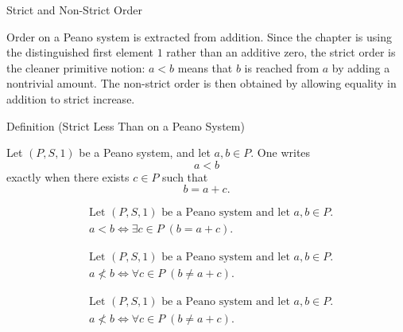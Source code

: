 \begin{topicbox}{Strict and Non-Strict Order}
\begin{exposition}
Order on a Peano system is extracted from addition. Since the chapter is using
the distinguished first element $1$ rather than an additive zero, the strict
order is the cleaner primitive notion: $a<b$ means that $b$ is reached from
$a$ by adding a nontrivial amount. The non-strict order is then obtained by
allowing equality in addition to strict increase.
\end{exposition}

\begin{definitionbox}{Definition (Strict Less Than on a Peano System)}
\begin{definition}
\label{def:strict-less-than-on-peano-system}
Let $(P,S,1)$ be a Peano system, and let $a,b \in P$. One writes
\[
a<b
\]
exactly when there exists $c \in P$ such that
\[
b=a+c.
\]
\end{definition}
\end{definitionbox}

\begin{remark*}
\[
\begin{aligned}
&\text{Let } (P,S,1) \text{ be a Peano system and let } a,b \in P.\\
&a<b
\Longleftrightarrow
\exists c \in P\;(b=a+c).
\end{aligned}
\]
\end{remark*}

\begin{remark*}
\[
\begin{aligned}
&\text{Let } (P,S,1) \text{ be a Peano system and let } a,b \in P.\\
&a \not< b
\Longleftrightarrow
\forall c \in P\;(b \neq a+c).
\end{aligned}
\]
\end{remark*}

\begin{remark*}
\[
\begin{aligned}
&\text{Let } (P,S,1) \text{ be a Peano system and let } a,b \in P.\\
&a \not< b
\Longleftrightarrow
\forall c \in P\;(b \neq a+c).
\end{aligned}
\]
\end{remark*}


\end{topicbox}
